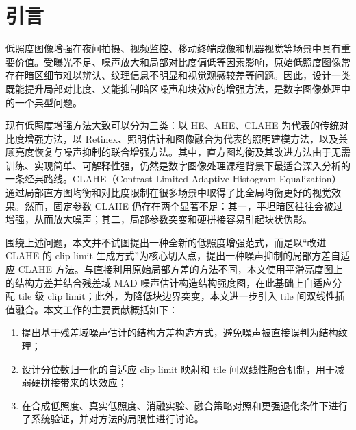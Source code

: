 \section{引言}

低照度图像增强在夜间拍摄、视频监控、移动终端成像和机器视觉等场景中具有重要价值。受曝光不足、噪声放大和局部对比度偏低等因素影响，原始低照度图像常存在暗区细节难以辨认、纹理信息不明显和视觉观感较差等问题。因此，设计一类既能提升局部对比度、又能抑制暗区噪声和块效应的增强方法，是数字图像处理中的一个典型问题。

现有低照度增强方法大致可以分为三类：以 HE、AHE、CLAHE 为代表的传统对比度增强方法\cite{pizer1987ahe,zuiderveld1994clahe}，以 Retinex、照明估计和图像融合为代表的照明建模方法\cite{jobson1997retinex,wang2013loe,fu2016fusion,guo2017lime}，以及兼顾亮度恢复与噪声抑制的联合增强方法\cite{li2015lowlight,ren2018joint}。其中，直方图均衡及其改进方法由于无需训练、实现简单、可解释性强，仍然是数字图像处理课程背景下最适合深入分析的一条经典路线。CLAHE（Contrast Limited Adaptive Histogram Equalization）通过局部直方图均衡和对比度限制在很多场景中取得了比全局均衡更好的视觉效果\cite{pizer1987ahe,zuiderveld1994clahe}。然而，固定参数 CLAHE 仍存在两个显著不足：其一，平坦暗区往往会被过增强，从而放大噪声；其二，局部参数突变和硬拼接容易引起块状伪影。

围绕上述问题，本文并不试图提出一种全新的低照度增强范式，而是以“改进 CLAHE 的 clip limit 生成方式”为核心切入点，提出一种噪声抑制的局部方差自适应 CLAHE 方法。与直接利用原始局部方差的方法不同，本文使用平滑亮度图上的结构方差并结合残差域 MAD 噪声估计构造结构强度图，在此基础上自适应分配 tile 级 clip limit；此外，为降低块边界突变，本文进一步引入 tile 间双线性插值融合。本文工作的主要贡献概括如下：

\begin{enumerate}
  \item 提出基于残差域噪声估计的结构方差构造方式，避免噪声被直接误判为结构纹理；
  \item 设计分位数归一化的自适应 clip limit 映射和 tile 间双线性融合机制，用于减弱硬拼接带来的块效应；
  \item 在合成低照度、真实低照度、消融实验、融合策略对照和更强退化条件下进行了系统验证，并对方法的局限性进行讨论。
\end{enumerate}
